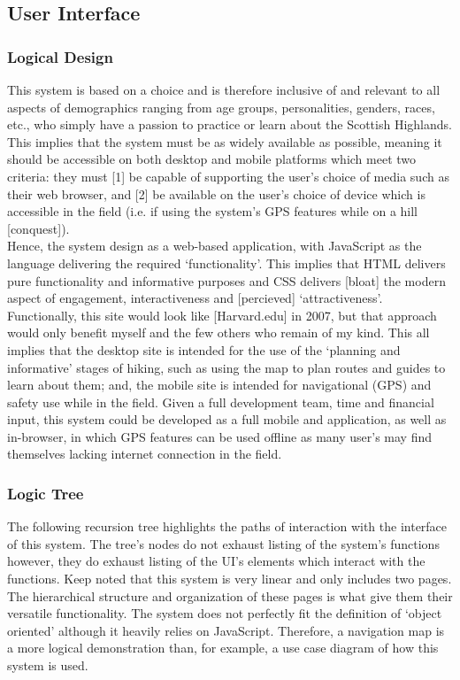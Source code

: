 \documentclass[11pt, english]{article}
\begin{document}
	\subsection{User Interface}

		\subsubsection{Logical Design}

	This system is based on a choice and is therefore inclusive of and relevant to all aspects of demographics ranging from age groups, personalities, genders, races, etc., who simply have a passion to practice or learn about the Scottish Highlands. This implies that the system must be as widely available as possible, meaning it should be accessible on both desktop and mobile platforms which meet two criteria: they must [1] be capable of supporting the user's choice of media such as their web browser, and [2] be available on the user's choice of device which is accessible in the field (i.e. if using the system's GPS features while on a hill [conquest]).\\

	Hence, the system design as a web-based application, with JavaScript as the language delivering the required `functionality'. This implies that HTML delivers pure functionality and informative purposes and CSS delivers [bloat] the modern aspect of engagement, interactiveness and [percieved] `attractiveness'. Functionally, this site would look like [Harvard.edu] in 2007, but that approach would only benefit myself and the few others who remain of my kind. This all implies that the desktop site is intended for the use of the `planning and informative' stages of hiking, such as using the map to plan routes and guides to learn about them; and, the mobile site is intended for navigational (GPS) and safety use while in the field. Given a full development team, time and financial input, this system could be developed as a full mobile and application, as well as in-browser, in which GPS features can be used offline as many user's may find themselves lacking internet connection in the field.

		\subsubsection{Logic Tree}

	The following recursion tree highlights the paths of interaction with the interface of this system. The tree's nodes do not exhaust listing of the system's functions however, they do exhaust listing of the UI's elements which interact with the functions. Keep noted that this system is very linear and only includes two pages. The hierarchical structure and organization of these pages is what give them their versatile functionality. The system does not perfectly fit the definition of `object oriented' although it heavily relies on JavaScript. Therefore, a navigation map is a more logical demonstration than, for example, a use case diagram of how this system is used.
\end{document}
